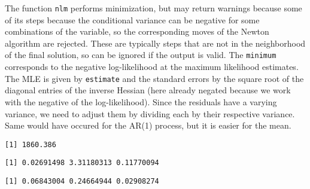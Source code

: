 \documentclass[]{book}
\newenvironment{Shaded}{\begin{snugshade}}{\end{snugshade}}
\newcommand{\KeywordTok}[1]{\textcolor[rgb]{0.13,0.29,0.53}{\textbf{#1}}}
\newcommand{\NormalTok}[1]{#1}
\newcommand{\OperatorTok}[1]{\textcolor[rgb]{0.81,0.36,0.00}{\textbf{#1}}}
\begin{document}
The function \texttt{nlm} performs minimization, but may return warnings
because some of its steps because the conditional variance can be
negative for some combinations of the variable, so the corresponding
moves of the Newton algorithm are rejected. These are typically steps
that are not in the neighborhood of the final solution, so can be
ignored if the output is valid. The \texttt{minimum} corresponds to the
negative log-likelihood at the maximum likelihood estimates. The MLE is
given by \texttt{estimate} and the standard errors by the square root of
the diagonal entries of the inverse Hessian (here already negated
because we work with the negative of the log-likelihood). Since the
residuals have a varying variance, we need to adjust them by dividing
each by their respective variance. Same would have occured for the AR(1)
process, but it is easier for the mean.

\begin{Shaded}
\end{Shaded}

\begin{verbatim}
[1] 1860.386
\end{verbatim}

\begin{Shaded}
\end{Shaded}

\begin{verbatim}
[1] 0.02691498 3.31180313 0.11770094
\end{verbatim}

\begin{Shaded}
\end{Shaded}

\begin{verbatim}
[1] 0.06843004 0.24664944 0.02908274
\end{verbatim}
\end{document}

